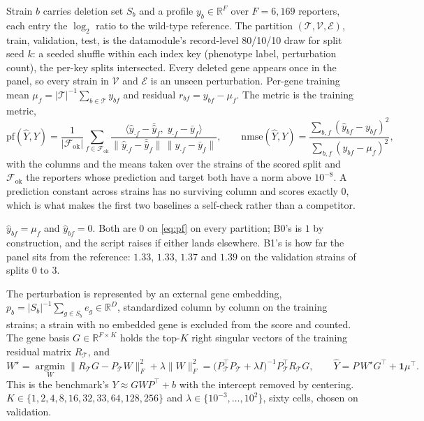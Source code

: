  Strain $b$ carries deletion set $S_b$ and a profile $y_b \in \mathbb{R}^F$
over $F = 6{,}169$ reporters, each entry the $\log_2$ ratio to the wild-type reference. The
partition $(\mathcal{T}, \mathcal{V}, \mathcal{E})$, train, validation, test, is the
datamodule's record-level 80/10/10 draw for split seed $k$: a seeded shuffle within each
index key (phenotype label, perturbation count), the per-key splits intersected. Every
deleted gene appears once in the panel, so every strain in $\mathcal{V}$ and $\mathcal{E}$
is an unseen perturbation. Per-gene training mean $\mu_f = |\mathcal{T}|^{-1}
\sum_{b \in \mathcal{T}} y_{bf}$ and residual $r_{bf} = y_{bf} - \mu_f$. The metric is the
training metric,
%
\begin{equation}
  \mathrm{pf}(\hat{Y}, Y)
  = \frac{1}{|\mathcal{F}_{\mathrm{ok}}|} \sum_{f \in \mathcal{F}_{\mathrm{ok}}}
    \frac{\langle \hat{y}_{\cdot f} - \bar{\hat{y}}_f,\; y_{\cdot f} - \bar{y}_f \rangle}
         {\|\hat{y}_{\cdot f} - \bar{\hat{y}}_f\|\,\|y_{\cdot f} - \bar{y}_f\|},
  \qquad
  \mathrm{nmse}(\hat{Y}, Y) = \frac{\sum_{b,f} (\hat{y}_{bf} - y_{bf})^2}
                                   {\sum_{b,f} (y_{bf} - \mu_f)^2},
  \label{eq:pf}
\end{equation}
%
with the columns and the means taken over the strains of the scored split and
$\mathcal{F}_{\mathrm{ok}}$ the reporters whose prediction and target both have a norm
above $10^{-8}$. A prediction constant across strains has no surviving column and scores
exactly $0$, which is what makes the first two baselines a self-check rather than a
competitor.

 $\hat{y}_{bf} = \mu_f$ and $\hat{y}_{bf} = 0$. Both are $0$ on
\cref{eq:pf} on every partition; B0's  is $1$ by construction, and the script
raises if either lands elsewhere. B1's  is how far the panel sits from the
reference: $1.33$, $1.33$, $1.37$ and $1.39$ on the validation strains of splits 0 to 3.

 The perturbation is represented by an external gene
embedding, $p_b = |S_b|^{-1} \sum_{g \in S_b} e_g \in \mathbb{R}^D$, standardized column by
column on the training strains; a strain with no embedded gene is excluded from the score
and counted. The gene basis $G \in \mathbb{R}^{F \times K}$ holds the top-$K$ right singular
vectors of the training residual matrix $R_{\mathcal{T}}$, and
%
\begin{equation}
  W^{\star} = \operatorname*{argmin}_{W}
    \big\| R_{\mathcal{T}} G - P_{\mathcal{T}} W \big\|_F^2 + \lambda \|W\|_F^2
  = \big( P_{\mathcal{T}}^{\top} P_{\mathcal{T}} + \lambda I \big)^{-1}
    P_{\mathcal{T}}^{\top} R_{\mathcal{T}} G,
  \qquad
  \hat{Y} = P\, W^{\star} G^{\top} + \mathbf{1} \mu^{\top}.
  \label{eq:b2}
\end{equation}
%
This is the benchmark's $Y \approx G W P^{\top} + b$ with the intercept removed by
centering. $K \in \{1, 2, 4, 8, 16, 32, 33, 64, 128, 256\}$ and
$\lambda \in \{10^{-3}, \ldots, 10^{2}\}$, sixty cells, chosen on validation.

